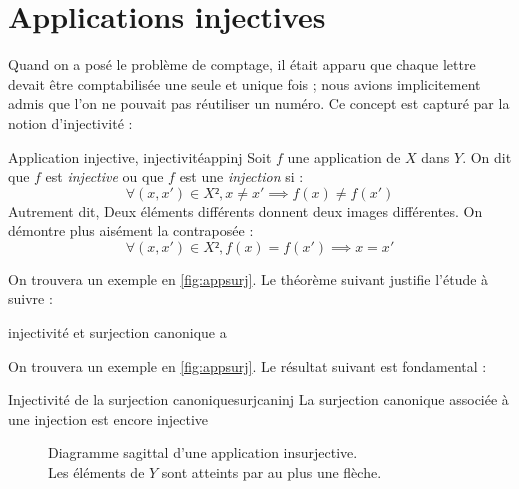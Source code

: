 \documentclass[a4paper,french,final]{memoir}
\begin{document}
  \section{Applications injectives}
  Quand on a posé le problème de comptage, il était apparu que chaque lettre devait être comptabilisée une seule et unique fois ; nous avions implicitement admis que l'on ne pouvait pas réutiliser un numéro. Ce concept est capturé par la notion d'injectivité :
  \begin{defb}{Application injective, injectivité}{appinj}
    Soit $f$ une application de $X$ dans $Y$.
    On dit que $f$ est \emph{injective} ou que $f$ est une \emph{injection} si  : \[\boxed{\forall (x,x') \in X², x\neq x'\implies f(x)\neq f(x')}\]
    Autrement dit, Deux éléments différents donnent deux images différentes. On démontre plus aisément la contraposée :
    \[\boxed{\forall (x,x') \in X², f(x)=f(x')\implies x=x'}\]
  \end{defb}
  On trouvera un exemple en \cref{fig:appsurj}. Le théorème suivant justifie l'étude à suivre : 
  \begin{theoremb}{injectivité et surjection canonique}{}
    a
  \end{theoremb}
  On trouvera un exemple en \cref{fig:appsurj}.
  Le résultat suivant est fondamental :
  \begin{theoremb}{Injectivité de la surjection canonique}{surjcaninj}
La surjection canonique associée à une injection est encore injective
  \end{theoremb}
  	\begin{figure}[htbp]
	\centering
%
	\caption[Diagramme sagittal d'une application injective]{Diagramme sagittal d'une application insurjective.\\ Les éléments de $Y$ sont atteints par au plus une flèche.}
	\label{fig:appinj}
\end{figure}
\end{document}
